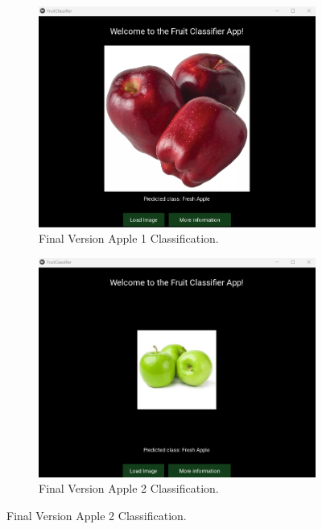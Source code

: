 \documentclass[conference]{IEEEtran}
\begin{document}
\begin{figure}[h]
    \centering
    \begin{subfigure}[b]{0.48\linewidth}
        \centering
        \includegraphics[width=\linewidth]{Mlayer appel1.png}
        \caption{Final Version Apple 1 Classification.}
        \label{figFA}
    \end{subfigure}
    \hfill
    \begin{subfigure}[b]{0.48\linewidth}
        \centering
        \includegraphics[width=\linewidth]{Mlayer appel2.png}
        \caption{Final Version Apple 2 Classification.}
        \label{figFB}
    \end{subfigure}

\end{figure}
\end{document}
